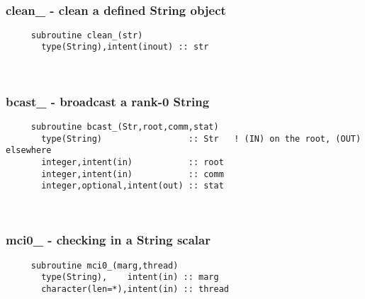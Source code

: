  
\mbox{}\hrulefill\ 
 
  \subsubsection{clean\_ - clean a defined String object}

\begin{verbatim} 
     subroutine clean_(str)
       type(String),intent(inout) :: str
 \end{verbatim}%
 
 
\mbox{}\hrulefill\ 
 
  \subsubsection{bcast\_ - broadcast a rank-0 String}

\begin{verbatim} 
     subroutine bcast_(Str,root,comm,stat)
       type(String)                 :: Str   ! (IN) on the root, (OUT) elsewhere
       integer,intent(in)           :: root
       integer,intent(in)           :: comm
       integer,optional,intent(out) :: stat
 \end{verbatim}%
 
 
\mbox{}\hrulefill\ 
 
  \subsubsection{mci0\_ - checking in a String scalar}

\begin{verbatim} 
     subroutine mci0_(marg,thread)
       type(String),    intent(in) :: marg
       character(len=*),intent(in) :: thread
 \end{verbatim}%
 
